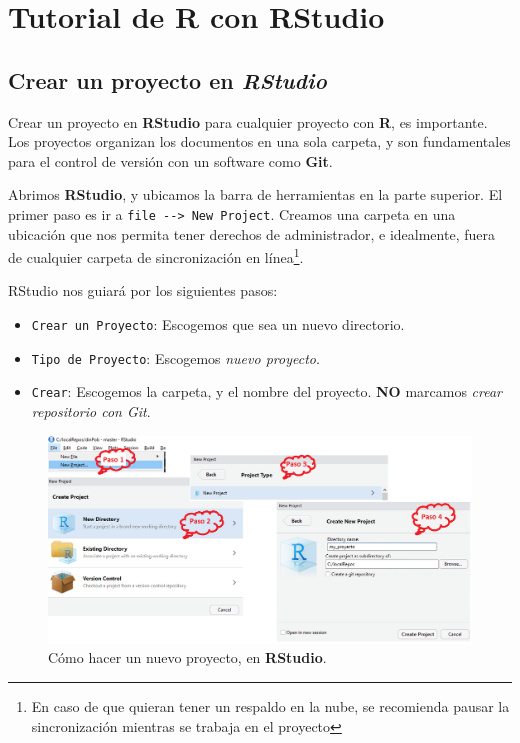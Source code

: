 \documentclass[12pt,letterpaper,]{book}
\let\rmarkdownfootnote\footnote%
\def\footnote{\protect\rmarkdownfootnote}
\begin{document}
\chapter{Tutorial de R con RStudio}\label{tutorial-de-r-con-rstudio}

\section{\texorpdfstring{Crear un proyecto en
\emph{RStudio}}{Crear un proyecto en RStudio}}\label{RStudioProject}

Crear un proyecto en \textbf{RStudio} para cualquier proyecto con
\textbf{R}, es importante. Los proyectos organizan los documentos en una
sola carpeta, y son fundamentales para el control de versión con un
software como \textbf{Git}.

Abrimos \textbf{RStudio}, y ubicamos la barra de herramientas en la
parte superior. El primer paso es ir a
\texttt{file\ -\/-\textgreater{}\ New\ Project}. Creamos una carpeta en
una ubicación que nos permita tener derechos de administrador, e
idealmente, fuera de cualquier carpeta de sincronización en
línea\footnote{En caso de que quieran tener un respaldo en la nube, se recomienda pausar la sincronización mientras se trabaja en el proyecto}.

RStudio nos guiará por los siguientes pasos:

\begin{itemize}
\item
  \texttt{Crear\ un\ Proyecto}: Escogemos que sea un nuevo directorio.
\item
  \texttt{Tipo\ de\ Proyecto}: Escogemos \emph{nuevo proyecto}.
\item
  \texttt{Crear}: Escogemos la carpeta, y el nombre del proyecto.
  \textbf{NO} marcamos \emph{crear repositorio con Git}.
\end{itemize}

\begin{figure}[thb!]

{\centering \includegraphics[width=0.95\linewidth]{figuras/RStudioNewProject} 

}

\caption{Cómo hacer un nuevo proyecto, en \textbf{RStudio}.}\label{fig:RStudioNewProject}
\end{figure}
\end{document}
